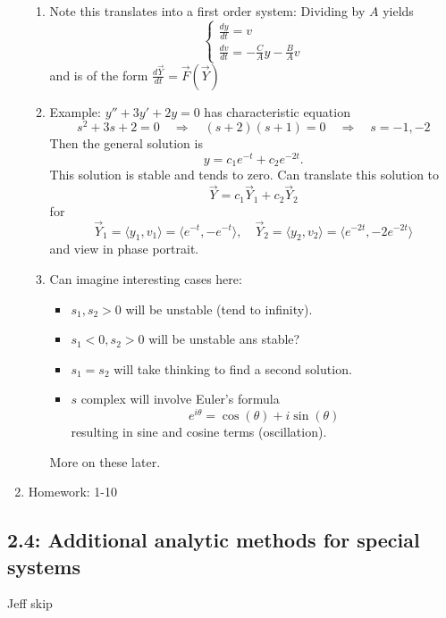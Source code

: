 \documentclass{article}
\begin{document}
\begin{enumerate}
\begin{enumerate}
\item Note this translates into a first order system: Dividing by $A$ yields
\[
\begin{cases}
\frac{dy}{dt} = v \\
\frac{dv}{dt} = -\frac{C}{A} y - \frac{B}{A} v
\end{cases}
\] 
and is of the form $\frac{d\vec{Y}}{dt} = \vec{F}(\vec{Y})$
\item Example: $y''+3y'+2y=0$ has characteristic equation 
\[
s^2+3s+2=0 \quad \Rightarrow \quad
(s+2)(s+1)=0 \quad \Rightarrow \quad
s=-1,-2
\]
Then the general solution is 
\[
y = c_1 e^{-t} + c_2 e^{-2t}.
\]
This solution is stable and tends to zero. Can translate this solution to 
\[
\vec{Y}= c_1 \vec{Y}_1 + c_2 \vec{Y}_2 
\]
for 
\[
\vec{Y}_1 = \langle y_1, v_1 \rangle = \langle e^{-t}, -e^{-t} \rangle, \quad 
\vec{Y}_2 = \langle y_2, v_2 \rangle = \langle e^{-2t}, -2e^{-2t} \rangle
\]
and view in phase portrait.
\item Can imagine interesting cases here:
\begin{itemize}
\item $s_1,s_2>0$ will be unstable (tend to infinity).
\item $s_1<0,s_2>0$ will be unstable ans stable?
\item $s_1=s_2$ will take thinking to find a second solution.
\item $s$ complex will involve Euler's formula
\[
e^{i\theta} = \cos(\theta) + i \sin(\theta)
\]
resulting in sine and cosine terms (oscillation).	
\end{itemize}
More on these later.
\end{enumerate}

\item Homework: 1-10

\end{enumerate}
\subsection{2.4: Additional analytic methods for special systems}
Jeff skip
\end{document}

